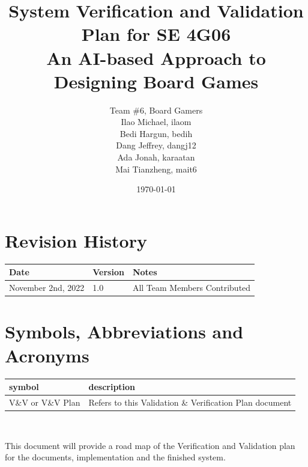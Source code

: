 \documentclass[12pt, titlepage]{article}
\begin{document}
\title{System Verification and Validation Plan for SE 4G06 \\ An AI-based Approach to Designing Board Games} 
\author{Team \#6, Board Gamers
\\ Ilao Michael, ilaom
\\ Bedi Hargun, bedih
\\ Dang Jeffrey, dangj12
\\ Ada Jonah, karaatan
\\ Mai Tianzheng, mait6}
\date{\today}
	
\maketitle


\section{Revision History}
\begin{tabularx}{\textwidth}{p{3cm}p{2cm}X}
\toprule {\bf Date} & {\bf Version} & {\bf Notes}\\
\midrule
November 2nd, 2022 & 1.0 & All Team Members Contributed\\
\bottomrule
\end{tabularx}

\newpage

\tableofcontents


\listoffigures

\newpage

\section{Symbols, Abbreviations and Acronyms}

\renewcommand{\arraystretch}{1.2}
\begin{tabular}{l l} 
  \toprule		
  \textbf{symbol} & \textbf{description}\\
  \midrule 
  V\&V or V\&V Plan & Refers to this Validation \& Verification Plan document\\
  \bottomrule
\end{tabular}\\


\newpage


This document will provide a road map of the Verification and Validation plan for the documents, implementation and the finished system.
\end{document}
